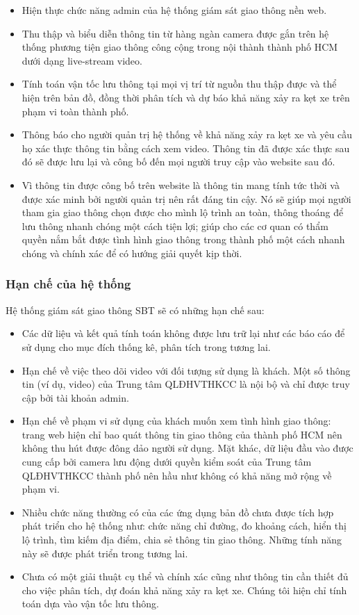 \begin{itemize}
	\item Hiện thực chức năng admin của hệ thống giám sát giao thông nền web.
	\item Thu thập và biểu diễn thông tin từ hàng ngàn camera được gắn trên hệ thống phương tiện giao thông công cộng trong nội thành thành phố HCM dưới dạng live-stream video.
	\item Tính toán vận tốc lưu thông tại mọi vị trí từ nguồn thu thập được và thể hiện trên bản đồ, đồng thời phân tích và dự báo khả năng xảy ra kẹt xe trên phạm vi toàn thành phố.
	\item Thông báo cho người quản trị hệ thống về khả năng xảy ra kẹt xe và yêu cầu họ xác thực thông tin bằng cách xem video. Thông tin đã được xác thực sau đó sẽ được lưu lại và công bố đến mọi người truy cập vào website sau đó.
	\item Vì thông tin được công bố trên website là thông tin mang tính tức thời và được xác minh bởi người quản trị nên rất đáng tin cậy. Nó sẽ giúp mọi người tham gia giao thông chọn được cho mình lộ trình an toàn, thông thoáng để lưu thông nhanh chóng một cách tiện lợi; giúp cho các cơ quan có thẩm quyền nắm bắt được tình hình giao thông trong thành phố một cách nhanh chóng và chính xác để có hướng giải quyết kịp thời.
\end{itemize}

\subsubsection{Hạn chế của hệ thống}
Hệ thống giám sát giao thông SBT sẽ có những hạn chế sau:

\begin{itemize}
	\item Các dữ liệu và kết quả tính toán không được lưu trữ lại như các báo cáo để sử dụng cho mục đích thống kê, phân tích trong tương lai.
	\item Hạn chế về việc theo dõi video với đối tượng sử dụng là khách. Một số thông tin (ví dụ, video) của Trung tâm QLĐHVTHKCC là nội bộ và chỉ được truy cập bởi tài khoản admin.
	\item Hạn chế về phạm vi sử dụng của khách muốn xem tình hình giao thông: trang web hiện chỉ bao quát thông tin giao thông của thành phố HCM nên không thu hút được đông dảo người sử dụng. Mặt khác, dữ liệu đầu vào được cung cấp bởi camera lưu động dưới quyền kiểm soát của Trung tâm QLĐHVTHKCC thành phố nên hầu như không có khả năng mở rộng về phạm vi.
	\item Nhiều chức năng thường có của các ứng dụng bản đồ chưa được tích hợp phát triển cho hệ thống như: chức năng chỉ đường, đo khoảng cách, hiển thị lộ trình, tìm kiếm địa điểm, chia sẻ thông tin giao thông. Những tính năng này sẽ được phát triển trong tương lai.
	\item Chưa có một giải thuật cụ thể và chính xác cũng như thông tin cần thiết đủ cho việc phân tích, dự đoán khả năng xảy ra kẹt xe. Chúng tôi hiện chỉ tính toán dựa vào vận tốc lưu thông.
\end{itemize}

